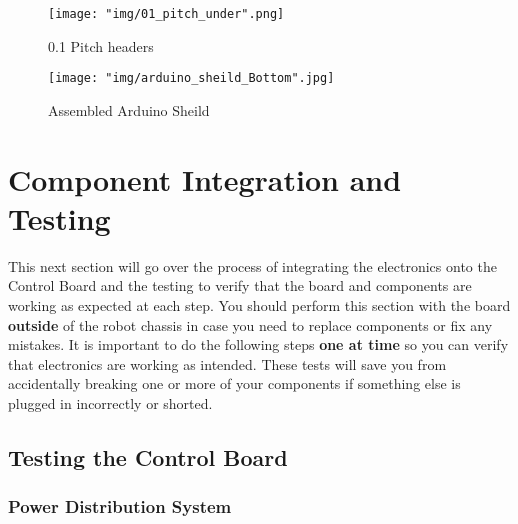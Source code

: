 \documentclass{article}
\begin{document}
\begin{enumerate}
\begin{figure}[H]
	\centering
	\texttt{[image: "img/01\_pitch\_under".png]}
	\caption{0.1 Pitch headers}
\end{figure}

\begin{figure}[H]
  \centering
  \begin{minipage}[b]{0.75\textwidth}
    \texttt{[image: "img/arduino\_sheild\_Bottom".jpg]}
  \end{minipage}
  \caption{Assembled Arduino Sheild}
  \label{assembled_arduino_sheild_bottom}
\end{figure}

\end{enumerate}

\section{Component Integration and Testing}

This next section will go over the process of integrating the electronics onto the Control Board and the testing to verify that the board and components are working as expected at each step. You should perform this section with the board \textbf{outside} of the robot chassis in case you need to replace components or fix any mistakes. It is important to do the following steps \textbf{one at time} so you can verify that electronics are working as intended. These tests will save you from accidentally breaking one or more of your components if something else is plugged in incorrectly or shorted.

\subsection{Testing the Control Board}
\subsubsection{Power Distribution System}
\end{document}

